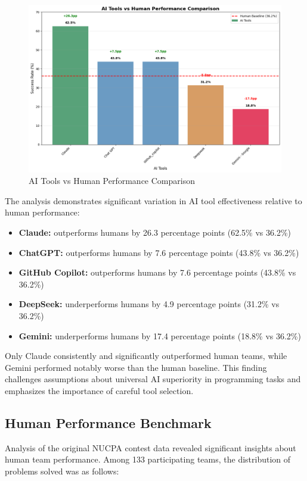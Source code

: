 \documentclass[conference]{IEEEtran}
\begin{document}
\begin{figure}[htbp]
\centering
\includegraphics[width=0.75\linewidth]{images/ai_tools_images_updated/ai_tools_vs_humns.png}
\caption{AI Tools vs Human Performance Comparison}
\label{fig:ai_vs_human}
\end{figure}

The analysis demonstrates significant variation in AI tool effectiveness relative to human performance:

\begin{itemize}
    \item \textbf{Claude:} outperforms humans by 26.3 percentage points (62.5\% vs 36.2\%)
    \item \textbf{ChatGPT:} outperforms humans by 7.6 percentage points (43.8\% vs 36.2\%)  
    \item \textbf{GitHub Copilot:} outperforms humans by 7.6 percentage points (43.8\% vs 36.2\%)
    \item \textbf{DeepSeek:} underperforms humans by 4.9 percentage points (31.2\% vs 36.2\%)
    \item \textbf{Gemini:} underperforms humans by 17.4 percentage points (18.8\% vs 36.2\%)
\end{itemize}

Only Claude consistently and significantly outperformed human teams, while Gemini performed notably worse than the human baseline. This finding challenges assumptions about universal AI superiority in programming tasks and emphasizes the importance of careful tool selection.

\subsection{Human Performance Benchmark}

Analysis of the original NUCPA contest data revealed significant insights about human team performance. Among 133 participating teams, the distribution of problems solved was as follows:
\end{document}
